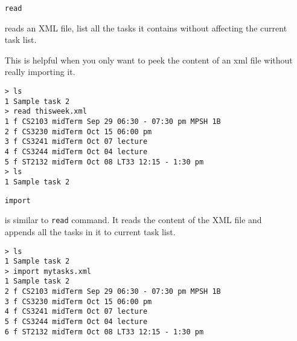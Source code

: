 \documentclass[12pt, a4paper]{article}
\begin{document}
\begin{enumerate}
\item [ \texttt{read} ]

  reads an XML file, list all the tasks it contains without affecting the current task list.

This is helpful when you only want to peek the content of an xml file without really importing it.

\texttt{\textgreater \ ls\\
    1   Sample task 2\\
    \textgreater \ read thisweek.xml \footnotemark \\
    1 f CS2103 midTerm Sep 29 06:30 - 07:30 pm MPSH 1B\\
    2 f CS3230 midTerm Oct 15 06:00 pm\\
    3 f CS3241 midTerm Oct 07 lecture\\
    4 f CS3244 midTerm Oct 04 lecture\\
    5 f ST2132 midTerm Oct 08 LT33 12:15 - 1:30 pm\\
    \textgreater \ ls\\
    1   Sample task 2}


\item [ \texttt{import} ]

  is similar to \texttt{read} command. It reads the content of the XML file and appends all the tasks in it to current task list.

\texttt{\textgreater \ ls\\
    1   Sample task 2\\
    \textgreater \ import mytasks.xml\\
    1   Sample task 2 \footnotemark\\
    2 f CS2103 midTerm Sep 29 06:30 - 07:30 pm MPSH 1B\\
    3 f CS3230 midTerm Oct 15 06:00 pm\\
    4 f CS3241 midTerm Oct 07 lecture\\
    5 f CS3244 midTerm Oct 04 lecture\\
    6 f ST2132 midTerm Oct 08 LT33 12:15 - 1:30 pm}



\end{enumerate}
\end{document}
